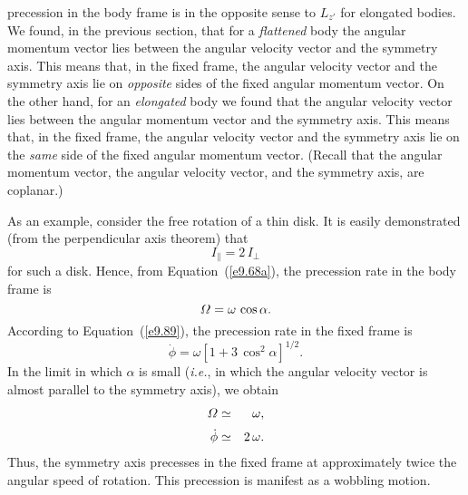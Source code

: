 precession in the body frame is in the opposite sense to $L_{z'}$ for elongated bodies. We
found, in the previous section, that for a {\em flattened}\/ body the angular
momentum  vector lies between the angular velocity vector and the symmetry
axis. This means that, in the fixed frame, the angular velocity vector
and the symmetry axis lie on {\em opposite}\/ sides of the fixed angular
momentum vector.  On the other hand, for an {\em elongated}\/ body
we found that the angular velocity vector lies between the angular momentum
vector and the symmetry axis. This means that, in the fixed frame, the
angular velocity vector and the symmetry axis lie on the {\em same}\/ side of
the fixed angular momentum vector. (Recall that the angular
momentum vector, the angular velocity vector, and the symmetry
axis, are coplanar.)

As an example, consider the free rotation of a thin disk. It is easily
demonstrated (from the perpendicular axis theorem)
that
\begin{equation}
I_\parallel = 2\,I_\perp
\end{equation}
for such a disk. Hence, from Equation~(\ref{e9.68a}), the precession rate in the
body frame is
\begin{equation}
{\mit\Omega} = \omega\,\cos\alpha.
\end{equation}
According to Equation~(\ref{e9.89}), the precession rate in the fixed frame is
\begin{equation}
\dot{\phi} = \omega\left[1+ 3\,\cos^2\alpha\right]^{1/2}.
\end{equation}
In the limit in which $\alpha$ is small ({\em i.e.}, in which the
angular velocity vector is almost parallel to the symmetry axis),
we obtain
\begin{eqnarray}
{\mit\Omega}&\simeq & \omega,\\[0.5ex]
\dot{\phi}&\simeq & 2\,\omega.
\end{eqnarray}
Thus, the symmetry axis precesses in the fixed frame at approximately
twice the angular speed of rotation. This precession is manifest as
a wobbling motion.

